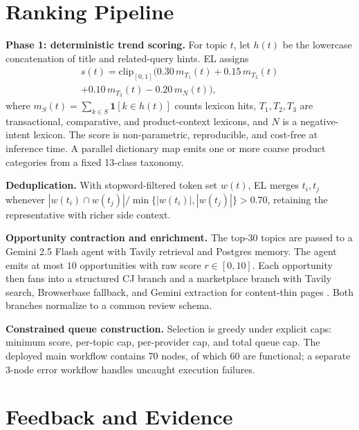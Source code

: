 \documentclass[conference,a4paper,10pt]{IEEEtran}
\begin{document}
\section{Ranking Pipeline}
\label{sec:pipeline}

\textbf{Phase 1: deterministic trend scoring.} For topic $t$, let $h(t)$ be the lowercase concatenation of title and related-query hints. EL assigns
\begin{equation}
\label{eq:intent}
\begin{split}
s(t)=\mathrm{clip}_{[0,1]}\bigl(
0.30\,m_{T_1}(t)+0.15\,m_{T_2}(t)\\
+0.10\,m_{T_3}(t)-0.20\,m_N(t)
\bigr),
\end{split}
\end{equation}
where $m_S(t)=\sum_{k\in S}\mathbf{1}[k\in h(t)]$ counts lexicon hits, $T_1,T_2,T_3$ are transactional, comparative, and product-context lexicons, and $N$ is a negative-intent lexicon. The score is non-parametric, reproducible, and cost-free at inference time. A parallel dictionary map emits one or more coarse product categories from a fixed 13-class taxonomy.

\textbf{Deduplication.} With stopword-filtered token set $w(t)$, EL merges $t_i,t_j$ whenever $|w(t_i)\cap w(t_j)|/\min\{|w(t_i)|,|w(t_j)|\}>0.70$, retaining the representative with richer side context.

\textbf{Opportunity contraction and enrichment.} The top-$30$ topics are passed to a Gemini 2.5 Flash agent with Tavily retrieval and Postgres memory. The agent emits at most $10$ opportunities with raw score $r\in[0,10]$. Each opportunity then fans into a structured CJ branch and a marketplace branch with Tavily search, Browserbase fallback, and Gemini extraction for content-thin pages \cite{browserbasedocs}. Both branches normalize to a common review schema.

\textbf{Constrained queue construction.} Selection is greedy under explicit caps: minimum score, per-topic cap, per-provider cap, and total queue cap. The deployed main workflow contains 70 nodes, of which 60 are functional; a separate 3-node error workflow handles uncaught execution failures.

\section{Feedback and Evidence}
\label{sec:evidence}
\end{document}
